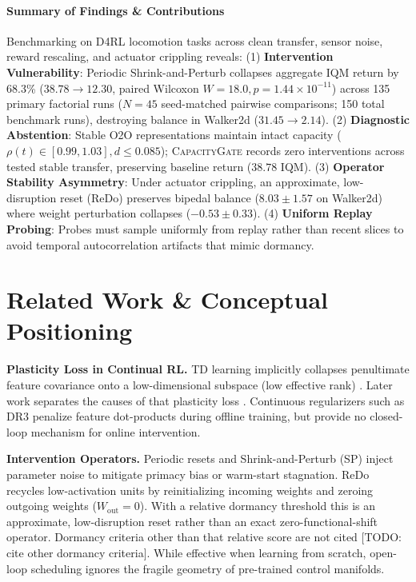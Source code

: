\documentclass{article}
\begin{document}
\paragraph{Summary of Findings \& Contributions}
Benchmarking on D4RL locomotion tasks \citep{fu2020d4rl} across clean transfer, sensor noise, reward rescaling, and actuator crippling reveals:
(1) \textbf{Intervention Vulnerability}: Periodic Shrink-and-Perturb collapses aggregate IQM return by 68.3\% ($38.78 \to 12.30$, paired Wilcoxon $W = 18.0, p = 1.44 \times 10^{-11}$) across 135 primary factorial runs ($N = 45$ seed-matched pairwise comparisons; 150 total benchmark runs), destroying balance in Walker2d ($31.45 \to 2.14$).
(2) \textbf{Diagnostic Abstention}: Stable O2O representations maintain intact capacity ($\rho(t) \in [0.99, 1.03], d \le 0.085$); \textsc{CapacityGate} records zero interventions across tested stable transfer, preserving baseline return ($38.78$ IQM).
(3) \textbf{Operator Stability Asymmetry}: Under actuator crippling, an approximate, low-disruption reset (ReDo) preserves bipedal balance ($8.03 \pm 1.57$ on Walker2d) where weight perturbation collapses ($-0.53 \pm 0.33$).
(4) \textbf{Uniform Replay Probing}: Probes must sample uniformly from replay rather than recent slices to avoid temporal autocorrelation artifacts that mimic dormancy.

\section{Related Work \& Conceptual Positioning}
\label{sec:related_work}

\textbf{Plasticity Loss in Continual RL.} TD learning implicitly collapses penultimate feature covariance onto a low-dimensional subspace (low effective rank) \citep{kumar2020implicit, lyle2023understanding, dohare2024loss}. Later work separates the causes of that plasticity loss \citep{lyle2024plasticity}. Continuous regularizers such as DR3 \citep{kumar2022dr3} penalize feature dot-products during offline training, but provide no closed-loop mechanism for online intervention.

\textbf{Intervention Operators.} Periodic resets \citep{nikishin2022primacy, doro2023sample, schwarzer2024bigger} and Shrink-and-Perturb (SP) \citep{ash2020warmstarting} inject parameter noise to mitigate primacy bias or warm-start stagnation. ReDo \citep{sokar2023dormant} recycles low-activation units by reinitializing incoming weights and zeroing outgoing weights ($W_{\mathrm{out}} = 0$). With a relative dormancy threshold this is an approximate, low-disruption reset rather than an exact zero-functional-shift operator. Dormancy criteria other than that relative score are not cited [TODO: cite other dormancy criteria]. While effective when learning from scratch, open-loop scheduling ignores the fragile geometry of pre-trained control manifolds.
\end{document}
